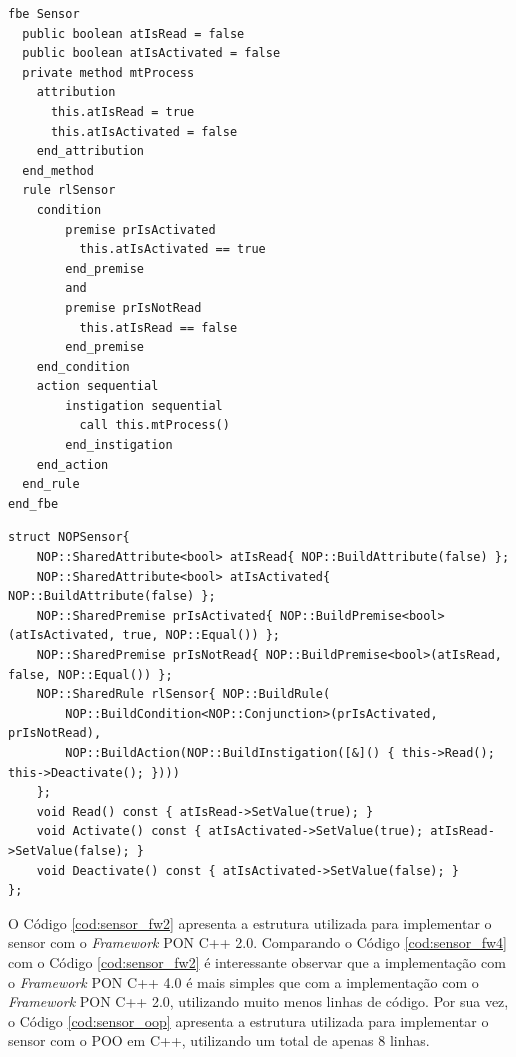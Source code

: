 \begin{lstlisting}[language=nopl, caption={\textit{FBE} \textit{Sensor} em LingPON},
  label = {cod:sensor_ex_nopl}, float=htb,
  source = {Fonte: Autoria própria}
  ]
fbe Sensor
  public boolean atIsRead = false
  public boolean atIsActivated = false
  private method mtProcess
    attribution
      this.atIsRead = true
      this.atIsActivated = false
    end_attribution
  end_method
  rule rlSensor
    condition
        premise prIsActivated
          this.atIsActivated == true
        end_premise
        and
        premise prIsNotRead
          this.atIsRead == false
        end_premise
    end_condition
    action sequential
        instigation sequential
          call this.mtProcess()
        end_instigation
    end_action
  end_rule
end_fbe
\end{lstlisting}

\begin{lstlisting}[caption = {Código da estrutura do sensor com o \textit{Framework} PON C++ 4.0},
  source = {Autoria própria}, float=htb,
  label = {cod:sensor_fw4}]
struct NOPSensor{
    NOP::SharedAttribute<bool> atIsRead{ NOP::BuildAttribute(false) };
    NOP::SharedAttribute<bool> atIsActivated{ NOP::BuildAttribute(false) };
    NOP::SharedPremise prIsActivated{ NOP::BuildPremise<bool>(atIsActivated, true, NOP::Equal()) };
    NOP::SharedPremise prIsNotRead{ NOP::BuildPremise<bool>(atIsRead, false, NOP::Equal()) };
    NOP::SharedRule rlSensor{ NOP::BuildRule(
        NOP::BuildCondition<NOP::Conjunction>(prIsActivated, prIsNotRead),
        NOP::BuildAction(NOP::BuildInstigation([&]() { this->Read(); this->Deactivate(); })))
    };
    void Read() const { atIsRead->SetValue(true); }
    void Activate() const { atIsActivated->SetValue(true); atIsRead->SetValue(false); }
    void Deactivate() const { atIsActivated->SetValue(false); }
};
\end{lstlisting}

\FloatBarrier

O Código \ref{cod:sensor_fw2} apresenta a estrutura utilizada para implementar o
sensor com o \textit{Framework} PON C++ 2.0. Comparando o Código
\ref{cod:sensor_fw4} com o Código \ref{cod:sensor_fw2} é interessante observar
que a implementação com o \textit{Framework} PON C++ 4.0 é mais simples que com
a implementação com o \textit{Framework} PON C++ 2.0, utilizando muito menos
linhas de código. Por sua vez, o Código \ref{cod:sensor_oop} apresenta a estrutura utilizada para
implementar o sensor com o POO em C++, utilizando um total de apenas 8 linhas.

